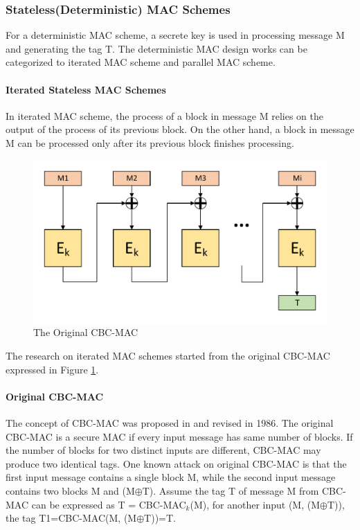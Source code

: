\documentclass{article}
\begin{document}
\subsubsection{Stateless(Deterministic) MAC Schemes}
For a deterministic MAC scheme, a secrete key is used in processing message M and generating the tag T. The deterministic MAC design works can be categorized to iterated MAC scheme and parallel MAC scheme.
\paragraph{Iterated Stateless MAC Schemes}
In iterated MAC scheme, the process of a block in message M relies on the output of the process of its previous block. On the other hand, a block in message M can be processed only after its previous block finishes processing. 
\begin{figure}[htbp]
\centering
\includegraphics[scale=0.3]{./diagrams/cbc-mac.pdf}
\caption{The Original CBC-MAC}
\label{fig:CBC-mac}
\end{figure}
The research on iterated MAC schemes started from the original CBC-MAC expressed in Figure \ref{fig:CBC-mac}.
\paragraph{Original CBC-MAC}
The concept of CBC-MAC was proposed in \cite{} and revised in 1986. The original CBC-MAC is a secure MAC if every input message has same number of blocks. If the number of blocks for two distinct inputs are different, CBC-MAC may produce two identical tags. One known attack on original CBC-MAC is that the first input message contains a single block M, while the second input message contains two blocks M and (M$\oplus$T). Assume the tag T of message M from CBC-MAC can be expressed as T = CBC-MAC$_k$(M), for another input (M, (M$\oplus$T)), the tag T1=CBC-MAC(M, (M$\oplus$T))=T. 
\end{document}
